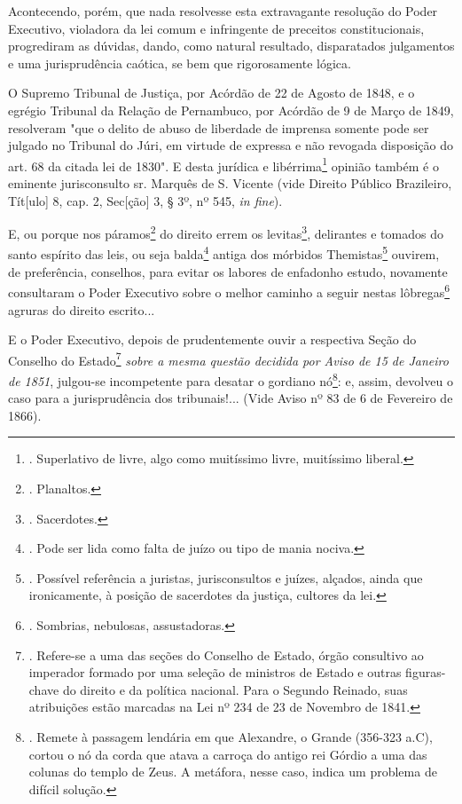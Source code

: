 Acontecendo, porém, que nada resolvesse esta extravagante resolução do
Poder Executivo, violadora da lei comum e infringente de preceitos
constitucionais, progrediram as dúvidas, dando, como natural resultado,
disparatados julgamentos e uma jurisprudência caótica, se bem que
rigorosamente lógica.

O Supremo Tribunal de Justiça, por Acórdão de 22 de Agosto de 1848, e o
egrégio Tribunal da Relação de Pernambuco, por Acórdão de 9 de Março de
1849, resolveram "que o delito de abuso de liberdade de imprensa somente
pode ser julgado no Tribunal do Júri, em virtude de expressa e não
revogada disposição do art. 68 da citada lei de 1830". E desta jurídica
e libérrima\footnote{. Superlativo de livre, algo como muitíssimo livre,
  muitíssimo liberal.} opinião também é o eminente jurisconsulto sr.
Marquês de S. Vicente (vide Direito Público Brazileiro, Tít{[}ulo{]} 8,
cap. 2, Sec{[}ção{]} 3, § 3º, nº 545, \emph{in fine}).

E, ou porque nos páramos\footnote{. Planaltos.} do direito errem os
levitas\footnote{. Sacerdotes.}, delirantes e tomados do santo espírito
das leis, ou seja balda\footnote{. Pode ser lida como falta de juízo ou
  tipo de mania nociva.} antiga dos mórbidos Themistas\footnote{.
  Possível referência a juristas, jurisconsultos e juízes, alçados,
  ainda que ironicamente, à posição de sacerdotes da justiça, cultores
  da lei.} ouvirem, de preferência, conselhos, para evitar os labores de
enfadonho estudo, novamente consultaram o Poder Executivo sobre o melhor
caminho a seguir nestas lôbregas\footnote{. Sombrias, nebulosas,
  assustadoras.} agruras do direito escrito...

E o Poder Executivo, depois de prudentemente ouvir a respectiva Seção do
Conselho do Estado\footnote{. Refere-se a uma das seções do Conselho de
  Estado, órgão consultivo ao imperador formado por uma seleção de
  ministros de Estado e outras figuras-chave do direito e da política
  nacional. Para o Segundo Reinado, suas atribuições estão marcadas na
  Lei nº 234 de 23 de Novembro de 1841.} \emph{sobre a mesma questão
decidida por Aviso de 15 de Janeiro de 1851}, julgou-se incompetente
para desatar o gordiano nó\footnote{. Remete à passagem lendária em que
  Alexandre, o Grande (356-323 a.C), cortou o nó da corda que atava a
  carroça do antigo rei Górdio a uma das colunas do templo de Zeus. A
  metáfora, nesse caso, indica um problema de difícil solução.}: e,
assim, devolveu o caso para a jurisprudência dos tribunais!... (Vide
Aviso nº 83 de 6 de Fevereiro de 1866).


